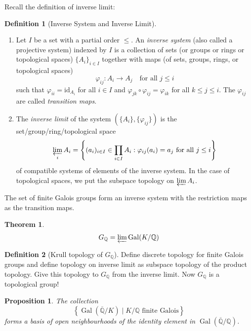 \documentclass{article}
\newtheorem{thm}{Theorem}[section]
\newtheorem{proposition}{Proposition}[section]
\theoremstyle{definition}
\newtheorem{definition}{Definition}[section]
\theoremstyle{definition}
\theoremstyle{definition}
\newcommand{\Gal}{\operatorname{Gal}}
\newcommand{\Q}{\mathbb{Q}}
\begin{document}
Recall the definition of inverse limit:

\begin{definition}[Inverse System and Inverse Limit]
\leavevmode
\begin{enumerate}
    \item Let $I$ be a set with a partial order $\leq$. An \emph{inverse system} (also called a projective system) indexed by $I$ is a collection of sets (or groups or rings or topological spaces) $\{A_i\}_{i \in I}$ together with maps (of sets, groups, rings, or topological spaces)
    \[
    \varphi_{ij} : A_i \to A_j \quad \text{for all } j \leq i
    \]
    such that $\varphi_{ii} = \mathrm{id}_{A_i}$ for all $i \in I$ and $\varphi_{jk} \circ \varphi_{ij} = \varphi_{ik}$ for all $k \leq j \leq i$. The $\varphi_{ij}$ are called \emph{transition maps}.

    \item The \emph{inverse limit} of the system $\left( \{A_i\}, \{\varphi_{ij}\} \right)$ is the set/group/ring/topological space
    \[
    \varprojlim_{i} A_i = \left\{ (a_i)_{i \in I} \in \prod_{i \in I} A_i : \varphi_{ij}(a_i) = a_j \text{ for all } j \leq i \right\}
    \]
    of compatible systems of elements of the inverse system. In the case of topological spaces, we put the subspace topology on $\varprojlim A_i$.
\end{enumerate}
\end{definition}


The set of finite Galois groups form an inverse system with the restriction maps as the transition maps.

\begin{thm}
    
$$G_\Q=\varprojlim \Gal(K/\Q) $$
\end{thm}

\begin{definition}[Krull topology of $G_\Q$]
    Define discrete topology for finite Galois groups and define topology on inverse limit as subspace topology of the product topology. Give this topology to $G_\Q$ from the inverse limit. Now $G_\Q$ is a topological group!
\end{definition}
\begin{proposition}
The collection
\[
\left\{ \operatorname{Gal}(\overline{\Q}/K) \mid K/\mathbb{Q} \text{ finite Galois} \right\}
\]
forms a basis of open neighbourhoods of the identity element in \( \operatorname{Gal}(\overline{\Q}/\mathbb{Q}) \).
\end{proposition}
\end{document}
